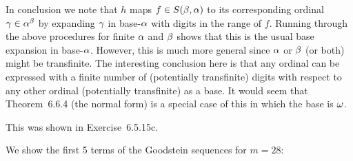 \begin{solution}
    In conclusion we note that $h$ maps $f \in S(\beta,\alpha)$ to its corresponding ordinal $\gamma \in \alpha^\beta$ by expanding $\gamma$ in base-$\alpha$ with digits in the range of $f$.
    Running through the above procedures for finite $\alpha$ and $\beta$ shows that this is the usual base expansion in base-$\alpha$.
    However, this is much more general since $\alpha$ or $\beta$ (or both) might be transfinite.
    The interesting conclusion here is that any ordinal can be expressed with a finite number of (potentially transfinite) digits with respect to any other ordinal (potentially transfinite) as a base.
    It would seem that Theorem~6.6.4 (the normal form) is a special case of this in which the base is $\omega$.
\end{solution}


\begin{solution}
	This was shown in Exercise~6.5.15c.
\end{solution}


\begin{solution}
	We show the first 5 terms of the Goodstein sequences for $m = 28$:
\end{solution}
